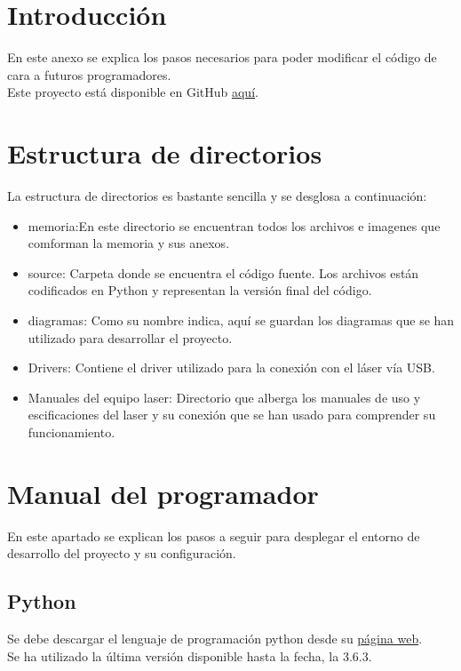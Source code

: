 
\section{Introducción}
En este anexo se explica los pasos necesarios para poder modificar el código de cara a futuros programadores.\\


Este proyecto está disponible en GitHub \href{https://github.com/mfe0007/TFG-Deteccion_de_pallets_mediante_LIDAR}{aquí}.\\

\section{Estructura de directorios}
La estructura de directorios es bastante sencilla y se desglosa a continuación:\\

\begin{itemize}
	\item memoria:En este directorio se encuentran todos los archivos e imagenes que comforman la memoria y sus anexos.
	\item source: Carpeta donde se encuentra el código fuente. Los archivos están codificados en Python y representan la versión final del código.
	\item diagramas: Como su nombre indica, aquí se guardan los diagramas que se han utilizado para desarrollar el proyecto.
	\item Drivers: Contiene el driver utilizado para la conexión con el láser vía USB.
	\item Manuales del equipo laser: Directorio que alberga los manuales de uso y escificaciones del laser y su conexión que se han usado para comprender su funcionamiento.
\end{itemize}



\section{Manual del programador}\label{instrucciones}
En este apartado se explican los pasos a seguir para desplegar el entorno de desarrollo del proyecto y su configuración.

\subsection{Python}
Se debe descargar el lenguaje de programación python desde su \href{https://www.python.org/downloads/release/python-363/}{página web}.\\
Se ha utilizado la última versión disponible hasta la fecha, la 3.6.3.\\


